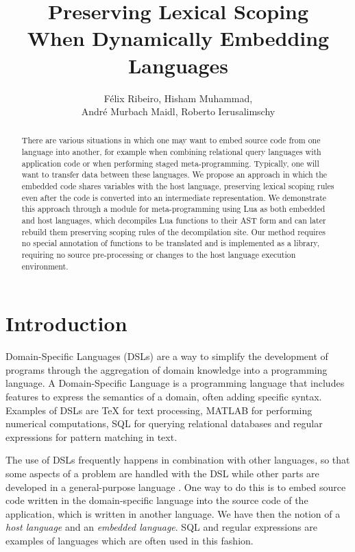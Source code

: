 \documentclass[english]{llncs}
\title{Preserving Lexical Scoping\\
When Dynamically Embedding Languages}
\author{
Félix Ribeiro,
Hisham Muhammad,\\
André Murbach Maidl,
Roberto Ierusalimschy
}
\institute{
Department of Computer Science --
PUC-Rio -- Rio de Janeiro -- Brazil
\email{\{fribeiro,hisham,amaidl,roberto\}@inf.puc-rio.br}
}
\begin{document}
\maketitle

\begin{abstract}

There are various situations in which one may want to embed source code from
one language into another, for example when combining relational query
languages with application code or when performing staged meta-programming.
Typically, one will want to transfer data between these languages.
We propose an approach in which the embedded code shares variables with the
host language, preserving lexical scoping rules even after the code is
converted into an intermediate representation. We demonstrate this approach
through a module for meta-programming using Lua as both embedded and host
languages, which decompiles Lua functions to their AST form and can later
rebuild them preserving scoping rules of the decompilation site. Our method
requires no special annotation of functions to be translated and is
implemented as a library, requiring no source pre-processing or changes to
the host language execution environment.

\end{abstract}

\section{Introduction}
\label{sec:introduction}

Domain-Specific Languages (DSLs) are a way to simplify the development
of programs through the aggregation of domain knowledge into a
programming language.
A Domain-Specific Language is a programming language that
includes features to express the semantics of a domain,
often adding specific syntax.
Examples of DSLs are \TeX{} for text processing, MATLAB for performing
numerical computations, SQL for querying relational databases and
regular expressions for pattern matching in text.

The use of DSLs frequently happens in combination with other languages, so
that some aspects of a problem are handled with the DSL while other parts are
developed in a general-purpose language \cite{Fowler:2010:DSL:1809745}. One
way to do this is to embed source code written in the domain-specific language
into the source code of the application, which is written in another language.
We have then the notion of a \emph{host language} and an \emph{embedded language}.
SQL and regular expressions are examples of languages which are often used in this fashion.
\end{document}
